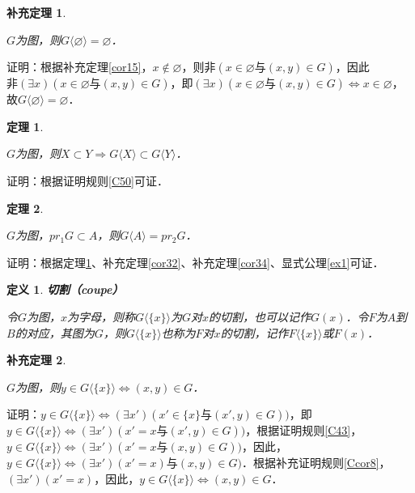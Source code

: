 \documentclass[12pt, a4paper, oneside]{book}
\newtheorem{theo}{定理}
\newtheorem{cor}{补充定理}
\newtheorem{de}{定义}
\begin{document}
			\begin{cor}\label{cor36}
				\hfill\par
				$G$为图，则$G\langle\varnothing\rangle= \varnothing$．
			\end{cor}
			证明：根据补充定理\ref{cor15}，$x\notin \varnothing$，则$\text{非}(x\in \varnothing\text{与}(x, y)\in G)$，因此$\text{非}(\exists x)(x\in \varnothing\text{与}(x, y)\in G)$，即$(\exists x)(x\in \varnothing\text{与}(x, y)\in G)\Leftrightarrow x\in \varnothing$，故$G\langle\varnothing\rangle=\varnothing$．

			\begin{theo}\label{theo12}
				\hfill\par
				$G$为图，则$X\subset Y\Rightarrow G\langle X \rangle \subset G\langle Y \rangle $．
			\end{theo}
			证明：根据证明规则\ref{C50}可证．

			\begin{theo}\label{theo13}
				\hfill\par
				$G$为图，$pr_1G\subset A$，则$G\langle A \rangle =pr_2G$．
			\end{theo}
			证明：根据定理\ref{theo12}、补充定理\ref{cor32}、补充定理\ref{cor34}、显式公理\ref{ex1}可证．

			\begin{de}
				\textbf{切割（coupe）}
				\par
				令$G$为图，$x$为字母，则称$G\langle\{x\}\rangle$为$G$对$x$的切割，也可以记作$G(x)$．令$F$为$A$到$B$的对应，其图为$G$，则$G\langle\{x\}\rangle$也称为$F$对$x$的切割，记作$F\langle\{x\}\rangle$或$F(x)$．
			\end{de}
					
			\begin{cor}\label{cor37}
				\hfill\par
				$G$为图，则$y\in G\langle \{x\} \rangle \Leftrightarrow (x, y)\in G$．			
			\end{cor}
			证明：$y\in G\langle \{x\} \rangle \Leftrightarrow (\exists x')(x'\in \{x\}\text{与}(x', y)\in G))$，即$y\in G\langle \{x\} \rangle \Leftrightarrow (\exists x')(x'=x\text{与}(x', y)\in G))$，根据证明规则\ref{C43}，$y\in G\langle \{x\} \rangle \Leftrightarrow (\exists x')(x'=x\text{与}(x, y)\in G))$，因此，$y\in G\langle \{x\} \rangle \Leftrightarrow (\exists x')(x'=x)\text{与}(x, y)\in G)$．根据补充证明规则\ref{Ccor8}，$(\exists x')(x'=x)$，因此，$y\in G\langle \{x\} \rangle \Leftrightarrow (x, y)\in G$．
			
\end{document}
